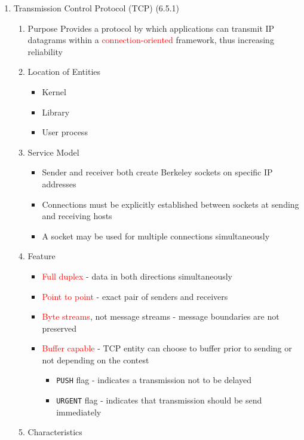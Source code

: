 \documentclass[a4paper,10pt]{article}
\newcommand{\red}[1]{\textcolor{red}{#1}}
\begin{document}
\begin{enumerate}
  \item Transmission Control Protocol (TCP) (6.5.1)
    \begin{enumerate}
      \item Purpose
        \newline Provides a protocol by which applications can transmit IP datagrams within a \red{connection-oriented} framework, thus increasing reliability
      \item Location of Entities
        \begin{itemize}
          \item Kernel
          \item Library
          \item User process
        \end{itemize}
      \item Service Model
        \begin{itemize}
          \item Sender and receiver both create Berkeley sockets on specific IP addresses
          \item Connections must be explicitly established between sockets at sending and receiving hosts
          \item A socket may be used for multiple connections simultaneously
        \end{itemize}
      \item Feature
        \begin{itemize}
          \item \red{Full duplex} - data in both directions simultaneously
          \item \red{Point to point} - exact pair of senders and receivers
          \item \red{Byte streams}, not message streams - message boundaries are not preserved
          \item \red{Buffer capable} - TCP entity can choose to buffer prior to sending or not depending on the contest
            \begin{itemize}
              \item \texttt{PUSH} flag - indicates a transmission not to be delayed
              \item \texttt{URGENT} flag - indicates that transmission should be send immediately
            \end{itemize}
        \end{itemize}
      \item Characteristics
        \begin{enumerate}

\end{enumerate}
\end{enumerate}
\end{enumerate}
\end{document}
